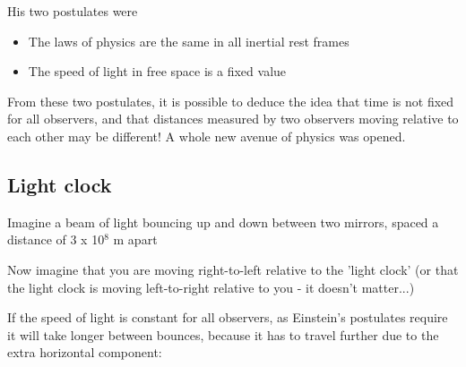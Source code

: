 \documentclass[main.tex]{subfiles}
\begin{document}



His two postulates were 
\begin{itemize}
	\item The laws of physics are the same in all inertial rest frames
	\item The speed of light in free space is a fixed value
\end{itemize}

From these two postulates, it is possible to deduce the idea that time is not fixed for all observers, and that distances measured by two observers moving relative to each other may be different! A whole new avenue of physics was opened.


\subsection{Light clock}

Imagine a beam of light bouncing up and down between two mirrors, spaced a distance of 3 x 10$^8$ m apart

\begin{figure}[h]
	\begin{center}
		
		
		\end{center}
\end{figure}

Now imagine that you are moving right-to-left relative to the 'light clock' (or that the light clock is moving left-to-right relative to you - it doesn't matter...)


If the speed of light is constant for all observers, as Einstein's postulates require it will take longer between bounces, because it has to travel further due to the extra horizontal component:
\end{document}
